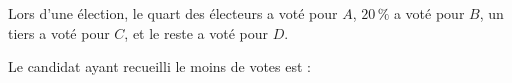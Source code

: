 
Lors d'une élection, le quart des électeurs a voté pour $A$, $20\,\%$ a voté pour $B$, un tiers a voté pour $C$, et le reste a voté pour $D$.

Le candidat ayant recueilli le moins de votes est :

\smallskip

